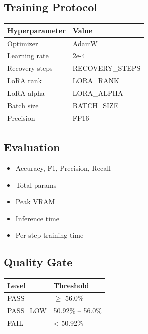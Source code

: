 \subsection{Training Protocol}

\begin{table}[H]
\centering
\small
\begin{tabular}{ll}
\toprule
\textbf{Hyperparameter} & \textbf{Value} \\
\midrule
Optimizer & AdamW \\
Learning rate & 2e-4 \\
Recovery steps & {{RECOVERY\_STEPS}} \\
LoRA rank & {{LORA\_RANK}} \\
LoRA alpha & {{LORA\_ALPHA}} \\
Batch size & {{BATCH\_SIZE}} \\
Precision & FP16 \\
\bottomrule
\end{tabular}
\end{table}

\subsection{Evaluation}

\begin{itemize}
\item Accuracy, F1, Precision, Recall
\item Total params
\item Peak VRAM
\item Inference time
\item Per-step training time

\end{itemize}
\subsection{Quality Gate}

\begin{table}[H]
\centering
\small
\begin{tabular}{ll}
\toprule
\textbf{Level} & \textbf{Threshold} \\
\midrule
PASS & $\ge$ 56.0\% \\
PASS\_LOW & 50.92\% -- 56.0\% \\
FAIL & < 50.92\% \\
\bottomrule
\end{tabular}
\end{table}


